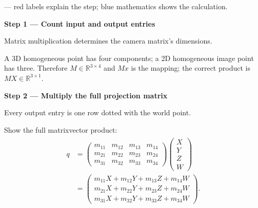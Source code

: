 \documentclass[letterpaper,11pt,english,openany,oneside]{jupyterBook}
\begin{document}
\sphinxAtStartPar
{} — red labels explain the step; blue mathematics shows the calculation.

\par\medskip{}
{\color{QuizStepRed}\bfseries Step 1 — Count input and output entries}\par\smallskip

\sphinxAtStartPar
{} Matrix multiplication determines the camera matrix’s dimensions.

\sphinxAtStartPar
A 3D homogeneous point has four components; a 2D homogeneous image point has three. Therefore {\color{QuizMathBlue} \(\boxed{M\in\mathbb R^{3\times4}}\)} and {\color{QuizMathBlue} \(Mx\!\)} is  the mapping; the correct product is {\color{QuizMathBlue} \(MX\in\mathbb R^{3\times1}\)}.

\par

\par\medskip{}
{\color{QuizStepRed}\bfseries Step 2 — Multiply the full projection matrix}\par\smallskip

\sphinxAtStartPar
{} Every output entry is one row dotted with the world point.

\sphinxAtStartPar
Show the full matrix\sphinxhyphen{}vector product:
{\color{QuizMathBlue} \begin{equation*}
\begin{split}
\begin{aligned}
q&=\begin{pmatrix}m_{11}&m_{12}&m_{13}&m_{14}\\m_{21}&m_{22}&m_{23}&m_{24}\\m_{31}&m_{32}&m_{33}&m_{34}\end{pmatrix}
\begin{pmatrix}X\\Y\\Z\\W\end{pmatrix}\\
&=\begin{pmatrix}m_{11}X+m_{12}Y+m_{13}Z+m_{14}W\\m_{21}X+m_{22}Y+m_{23}Z+m_{24}W\\m_{31}X+m_{32}Y+m_{33}Z+m_{34}W\end{pmatrix}.
\end{aligned}
\end{split}
\end{equation*}}
\par
\end{document}
